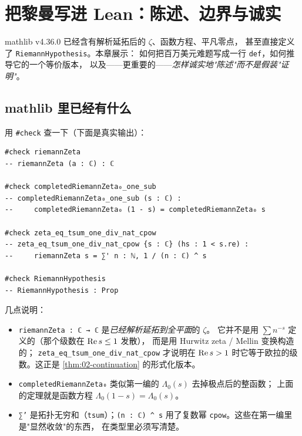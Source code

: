 \chapter{把黎曼写进 Lean：陈述、边界与诚实}
\label{chap:lean-riemann}

\begin{keybox}[本章要点]
mathlib v4.36.0 已经含有解析延拓后的 $\zeta$、函数方程、平凡零点，
甚至直接定义了 \texttt{RiemannHypothesis}。本章展示：
如何把百万美元难题写成一行 \texttt{def}，如何推导它的一个等价版本，
以及——更重要的——\emph{怎样诚实地"陈述"而不是假装"证明"}。
\end{keybox}

\section{mathlib 里已经有什么}
\label{sec:08-what-exists}

用 \texttt{\#check} 查一下（下面是真实输出）：

\begin{lstlisting}[language=Lean,numbers=none,frame=none,xleftmargin=0pt]
#check riemannZeta
-- riemannZeta (a : ℂ) : ℂ

#check completedRiemannZeta₀_one_sub
-- completedRiemannZeta₀_one_sub (s : ℂ) :
--     completedRiemannZeta₀ (1 - s) = completedRiemannZeta₀ s

#check zeta_eq_tsum_one_div_nat_cpow
-- zeta_eq_tsum_one_div_nat_cpow {s : ℂ} (hs : 1 < s.re) :
--     riemannZeta s = ∑' n : ℕ, 1 / (n : ℂ) ^ s

#check RiemannHypothesis
-- RiemannHypothesis : Prop
\end{lstlisting}

几点说明：

\begin{itemize}
  \item \texttt{riemannZeta : ℂ → ℂ} 是\emph{已经解析延拓到全平面}的 $\zeta$。
        它并不是用 $\sum n^{-s}$ 定义的（那个级数在 $\operatorname{Re} s\le1$ 发散），
        而是用 Hurwitz zeta / Mellin 变换构造的；
        \texttt{zeta\_eq\_tsum\_one\_div\_nat\_cpow} 才说明在 $\operatorname{Re} s>1$
        时它等于欧拉的级数。这正是 \cref{thm:02-continuation} 的形式化版本。
  \item \texttt{completedRiemannZeta₀} 类似第一编的 $\Lambda_0(s)$ 去掉极点后的整函数；
        上面的定理就是函数方程 $\Lambda_0(1-s)=\Lambda_0(s)$。
  \item \texttt{∑'} 是拓扑无穷和（\texttt{tsum}）；\texttt{(n : ℂ) \textasciicircum{} s}
        用了复数幂 \texttt{cpow}。这些在第一编里是"显然收敛"的东西，
        在类型里必须写清楚。
\end{itemize}

